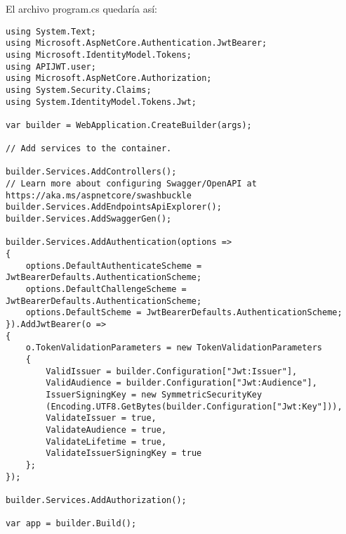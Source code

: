 \documentclass[executivepaper]{article}
\begin{document}
\begin{enumerate}
  El archivo program.cs quedaría así:
  \begin{lstlisting}
using System.Text;
using Microsoft.AspNetCore.Authentication.JwtBearer;
using Microsoft.IdentityModel.Tokens;
using APIJWT.user;
using Microsoft.AspNetCore.Authorization;
using System.Security.Claims;
using System.IdentityModel.Tokens.Jwt;

var builder = WebApplication.CreateBuilder(args);

// Add services to the container.

builder.Services.AddControllers();
// Learn more about configuring Swagger/OpenAPI at https://aka.ms/aspnetcore/swashbuckle
builder.Services.AddEndpointsApiExplorer();
builder.Services.AddSwaggerGen();

builder.Services.AddAuthentication(options =>
{
    options.DefaultAuthenticateScheme = JwtBearerDefaults.AuthenticationScheme;
    options.DefaultChallengeScheme = JwtBearerDefaults.AuthenticationScheme;
    options.DefaultScheme = JwtBearerDefaults.AuthenticationScheme;
}).AddJwtBearer(o =>
{
    o.TokenValidationParameters = new TokenValidationParameters
    {
        ValidIssuer = builder.Configuration["Jwt:Issuer"],
        ValidAudience = builder.Configuration["Jwt:Audience"],
        IssuerSigningKey = new SymmetricSecurityKey
        (Encoding.UTF8.GetBytes(builder.Configuration["Jwt:Key"])),
        ValidateIssuer = true,
        ValidateAudience = true,
        ValidateLifetime = true,
        ValidateIssuerSigningKey = true
    };
});

builder.Services.AddAuthorization();

var app = builder.Build();


\end{lstlisting}
\end{enumerate}
\end{document}

